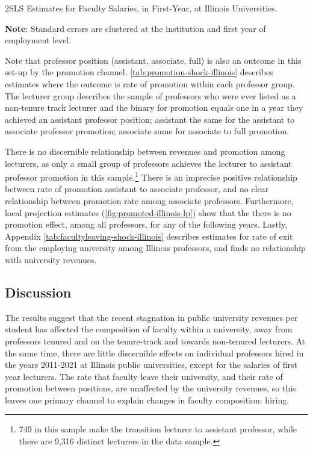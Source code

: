 \documentclass[notitlepage,12pt]{article}
\begin{document}
\begin{table}[!h]
    \onehalfspacing
    \centering
    \caption{2SLS Estimates for Faculty Salaries, in First-Year, at Illinois Universities.}
    \makebox[\textwidth][c]{}
    \begin{flushleft}
        \footnotesize
        \textbf{Note}: Standard errors are clustered at the institution and first year of employment level. 
    \end{flushleft}
    \label{tab:newhiresalaries-shock-illinois}
\end{table}

Note that professor position (assistant, associate, full) is also an outcome in this set-up by the promotion channel.
\autoref{tab:promotion-shock-illinois} describes estimates where the outcome is rate of promotion within each professor group.
The lecturer group describes the sample of professors who were ever listed as a non-tenure track lecturer and the binary for promotion equals one in a year they achieved an assistant professor position; assistant the same for the assistant to associate professor promotion; associate same for associate to full promotion.

There is no discernible relationship between revenues and promotion among lecturers, as only a small group of professors achieves the lecturer to assistant professor promotion in this sample.\footnote{
    749 in this sample make the transition lecturer to assistant professor, while there are 9,316 distinct lecturers in the data sample.
}
There is an imprecise positive relationship between rate of promotion assistant to associate professor, and no clear relationship between promotion rate among associate professors.
Furthermore, local projection estimates (\autoref{fig:promoted-illinois-lp}) show that the there is no promotion effect, among all professors, for any of the following years.
Lastly, Appendix \autoref{tab:facultyleaving-shock-illinois} describes estimates for rate of exit from the employing university among Illinois professors, and finds no relationship with university revenues.

\subsection{Discussion}

The results suggest that the recent stagnation in public university revenues per student has affected the composition of faculty within a university, away from professors tenured and on the tenure-track and towards non-tenured lecturers.
At the same time, there are little discernible effects on individual professors hired in the years 2011-2021 at Illinois public universities, except for the salaries of first year lecturers.
The rate that faculty leave their university, and their rate of promotion between positions, are unaffected by the university revenues, so this leaves one primary channel to explain changes in faculty composition: hiring.
\end{document}
